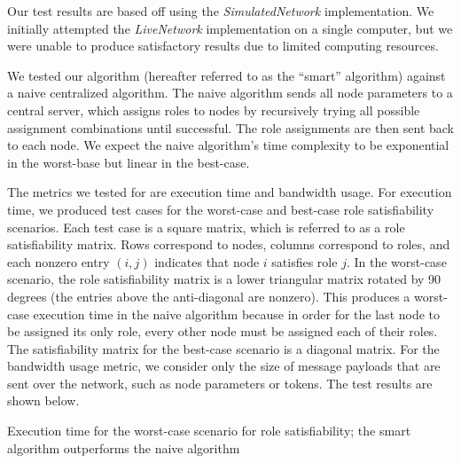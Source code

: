 \documentclass[11pt]{article}
\makeatletter
\newenvironment{figurehere}
{\def\@captype{figure}}
{}
\makeatother
\begin{document}
\begin{multicols}{2}
Our test results are based off using the \textit{SimulatedNetwork} implementation. We initially attempted the \textit{LiveNetwork} implementation on a single computer, but we were unable to produce satisfactory results due to limited computing resources.

We tested our algorithm (hereafter referred to as the ``smart'' algorithm) against a naive centralized algorithm. The naive algorithm sends all node parameters to a central server, which assigns roles to nodes by recursively trying all possible assignment combinations until successful. The role assignments are then sent back to each node. We expect the naive algorithm's time complexity to be exponential in the worst-base but linear in the best-case.

The metrics we tested for are execution time and bandwidth usage. For execution time, we produced test cases for the worst-case and best-case role satisfiability scenarios. Each test case is a square matrix, which is referred to as a role satisfiability matrix. Rows correspond to nodes, columns correspond to roles, and each nonzero entry $(i, j)$ indicates that node $i$ satisfies role $j$. In the worst-case scenario, the role satisfiability matrix is a lower triangular matrix rotated by 90 degrees (the entries above the anti-diagonal are nonzero). This produces a worst-case execution time in the naive algorithm because in order for the last node to be assigned its only role, every other node must be assigned each of their roles. The satisfiability matrix for the best-case scenario is a diagonal matrix. For the bandwidth usage metric, we consider only the size of message payloads that are sent over the network, such as node parameters or tokens. The test results are shown below.

\begin{figurehere}
\centering
{}
\caption{Execution time for the worst-case scenario for role satisfiability; the smart algorithm outperforms the naive algorithm}
\end{figurehere}
\vspace{.1in}


\end{multicols}
\end{document}
